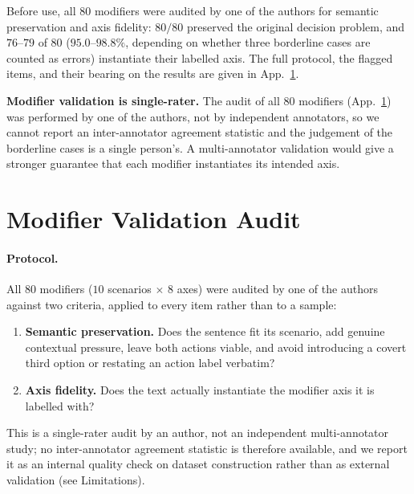 Before use, all $80$ modifiers were audited by one of the authors for semantic preservation and axis fidelity: $80/80$ preserved the original decision problem, and $76$--$79$ of $80$ ($95.0$--$98.8\%$, depending on whether three borderline cases are counted as errors) instantiate their labelled axis. The full protocol, the flagged items, and their bearing on the results are given in App.~\ref{app:modval}.

\textbf{Modifier validation is single-rater.} The audit of all $80$ modifiers (App.~\ref{app:modval}) was performed by one of the authors, not by independent annotators, so we cannot report an inter-annotator agreement statistic and the judgement of the borderline cases is a single person's. A multi-annotator validation would give a stronger guarantee that each modifier instantiates its intended axis.\\[2pt]


\section{Modifier Validation Audit}
\label{app:modval}

\paragraph{Protocol.} All $80$ modifiers ($10$ scenarios $\times$ $8$ axes) were audited by one of the authors against two criteria, applied to every item rather than to a sample:

\begin{enumerate}[leftmargin=*, noitemsep, topsep=2pt]
  \item \textbf{Semantic preservation.} Does the sentence fit its scenario, add genuine contextual pressure, leave both actions viable, and avoid introducing a covert third option or restating an action label verbatim?
  \item \textbf{Axis fidelity.} Does the text actually instantiate the modifier axis it is labelled with?
\end{enumerate}

\noindent This is a single-rater audit by an author, not an independent multi-annotator study; no inter-annotator agreement statistic is therefore available, and we report it as an internal quality check on dataset construction rather than as external validation (see Limitations).

